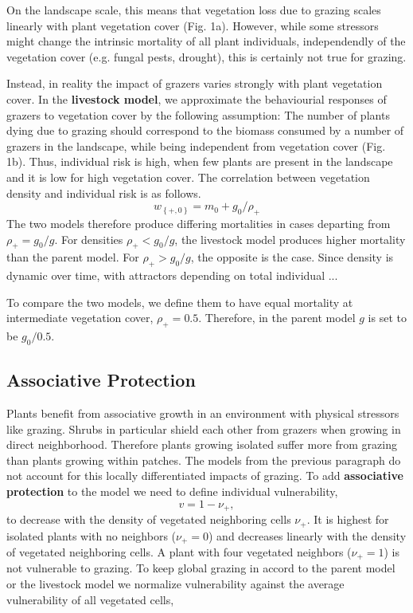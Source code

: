 On the landscape scale, this means that vegetation loss due to grazing scales linearly with plant vegetation cover (Fig. 1a). However, while some stressors might change the intrinsic mortality of all plant individuals, independendly of the vegetation cover (e.g. fungal pests, drought), this is certainly not true for grazing.

Instead, in reality the impact of grazers varies strongly with plant vegetation cover. In the \textbf{livestock model}, we approximate the behaviourial responses of grazers to vegetation cover by the following assumption: The number of plants dying due to grazing should correspond to the biomass consumed by a number of grazers in the landscape, while being independent from vegetation cover  (Fig. 1b). Thus, individual risk is high, when few plants are present in the landscape and it is low for high vegetation cover. The correlation between vegetation density and individual risk is as follows. 
\begin{equation}
	w_{ \left\{ +,0 \right\} }  = m_0 + g_0 / \rho_+
\end{equation}
The two models therefore produce differing mortalities in cases departing from  $ \rho_+ = g_0 / g$. For densities $ \rho_+ < g_0 / g$, the livestock model produces higher mortality than the parent model. For $ \rho_+ > g_0 / g$, the opposite is the case. Since density is dynamic over time, with attractors depending on total individual ... 

To compare the two models, we define them to have equal mortality at intermediate vegetation cover, $\rho_+ = 0.5$. Therefore, in the parent model $g$ is set to be $g_0/0.5$. 

\subsection{Associative Protection}
Plants benefit from associative growth in an environment with physical stressors like grazing. Shrubs in particular shield each other from grazers when growing in direct neighborhood. Therefore plants growing isolated suffer more from grazing than plants growing within patches.
The models from the previous paragraph do not account for this locally differentiated impacts of grazing. To add \textbf{associative protection} to the model we need to define individual vulnerability, 
\begin{equation}
v = 1 - \nu_+ ,
\end{equation}
to decrease with the density of vegetated neighboring cells $\nu_+$. It is highest for isolated plants with no neighbors ($\nu_+ = 0$) and decreases linearly with the density of vegetated neighboring cells. A plant with four vegetated neighbors ($\nu_+ = 1$) is not vulnerable to grazing. 
To keep global grazing in accord to the parent model or the livestock model we normalize vulnerability against the average vulnerability of all vegetated cells,

